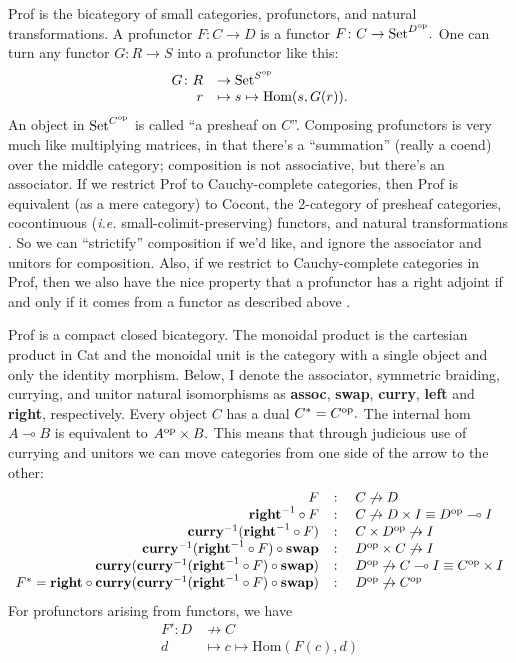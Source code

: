 \documentclass[12pt,twoside,openright]{report}
\newcommand{\Set}{\mathrm{Set}}
\newcommand{\maps}{\colon}
\newcommand{\lhom}{\multimap}
\newcommand{\op}{{\rm op}}
\newcommand{\mbold}[1]{\mbox{\bf #1}}
\newcommand{\Hom}{\mbox{Hom}}
\begin{document}
Prof is the bicategory of small categories, profunctors, and natural transformations.  A profunctor $F\maps C \to D$ is a functor $F\maps C \to \Set^{D^{\op}}.$  One can turn any functor $G\maps R \to S$ into a profunctor like this:
\[ \begin{array}{rl}G\maps R &\to \Set^{S^{\op}} \\ r & \mapsto s \mapsto \Hom(s, G(r)).\end{array} \]
An object in $\Set^{C^{\op}}$ is called ``a presheaf on $C$''.  Composing profunctors is very much like multiplying matrices, in that there's a ``summation'' (really a coend) over the middle category; composition is not associative, but there's an associator.  If we restrict Prof to Cauchy-complete categories, then Prof is equivalent (as a mere category) to Cocont, the 2-category of presheaf categories, cocontinuous ({\em i.e.} small-colimit-preserving) functors, and natural transformations \cite[2.7.4]{KS06}.  So we can ``strictify'' composition if we'd like, and ignore the associator and unitors for composition.  Also, if we restrict to Cauchy-complete categories in Prof, then we also have the nice property that a profunctor has a right adjoint if and only if it comes from a functor as described above \cite[Theorem 4.51]{Kelly82}.

Prof is a compact closed bicategory.  The monoidal product is the cartesian product in Cat and the monoidal unit is the category with a single object and only the identity morphism.  Below, I denote the associator, symmetric braiding, currying, and unitor natural isomorphisms as \textbf{assoc}, \textbf{swap}, \textbf{curry}, \textbf{left} and \textbf{right}, respectively.  Every object $C$ has a dual $C^* = C^{\op}.$  The internal hom $A \lhom B$ is equivalent to $A^{\op} \times B.$  This means that through judicious use of currying and unitors we can move categories from one side of the arrow to the other:
\[ \begin{array}{rcl}
  F& \maps & C \not\to D \\
  \mbold{right}^{-1} \circ F& \maps & C \not\to D \times I \equiv D^{\op} \lhom I \\
  \mbold{curry}^{-1}(\mbold{right}^{-1} \circ F)& \maps & C \times D^{\op} \not\to I \\
  \mbold{curry}^{-1}(\mbold{right}^{-1} \circ F) \circ \mbold{swap}& \maps & D^{\op} \times C \not\to I \\
  \mbold{curry}(\mbold{curry}^{-1}(\mbold{right}^{-1} \circ F) \circ \mbold{swap})& \maps & D^{\op} \not\to C \lhom I \equiv C^{\op} \times I \\
  F^* = \mbold{right} \circ \mbold{curry}(\mbold{curry}^{-1}(\mbold{right}^{-1} \circ F) \circ \mbold{swap})& \maps & D^{\op} \not\to C^{\op}
\end{array} \]
For profunctors arising from functors, we have
\[ \begin{array}{rl}F'\maps D &\not\to C \\ d &\mapsto c \mapsto \Hom(F(c), d)\end{array} \]
\end{document}
